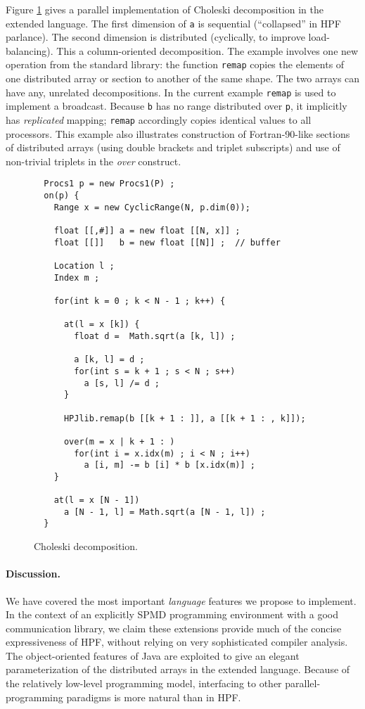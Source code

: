 Figure \ref{Choleski} gives a parallel implementation
of Choleski decomposition in the extended language.
The first dimension of {\tt a} is sequential (``collapsed''
in HPF parlance).  The second dimension is distributed (cyclically,
to improve load-balancing).  This a column-oriented decomposition.
The example involves one new operation from
the standard library: the function {\tt remap} copies the elements
of one distributed array or section to another of the same shape.
The two arrays can have any, unrelated decompositions.
In the current example {\tt remap} is used to implement a broadcast.
Because {\tt b} has no range distributed over {\tt p},
it implicitly has {\em replicated} mapping; {\tt remap} accordingly
copies identical values to all processors.  This example also
illustrates construction of Fortran-90-like sections of distributed arrays
(using double brackets and triplet subscripts)
and use of non-trivial triplets in the {\em over} construct.

\begin{figure}[bt]
\footnotesize
\begin{verbatim}
  Procs1 p = new Procs1(P) ;
  on(p) {
    Range x = new CyclicRange(N, p.dim(0));

    float [[,#]] a = new float [[N, x]] ;
    float [[]]   b = new float [[N]] ;  // buffer

    Location l ;
    Index m ;

    for(int k = 0 ; k < N - 1 ; k++) {

      at(l = x [k]) {
        float d =  Math.sqrt(a [k, l]) ;

        a [k, l] = d ;
        for(int s = k + 1 ; s < N ; s++)
          a [s, l] /= d ;
      }

      HPJlib.remap(b [[k + 1 : ]], a [[k + 1 : , k]]);

      over(m = x | k + 1 : )
        for(int i = x.idx(m) ; i < N ; i++)
          a [i, m] -= b [i] * b [x.idx(m)] ;
    }

    at(l = x [N - 1])
      a [N - 1, l] = Math.sqrt(a [N - 1, l]) ;
  }
\end{verbatim}
\normalsize
\caption{\label{Choleski}Choleski decomposition.}
\end{figure}

\paragraph{Discussion.}

We have covered the most important {\em language} features we
propose to implement.  In the
context of an explicitly SPMD programming environment with a good
communication library, we claim these extensions provide much of the
concise expressiveness of HPF, without relying on very sophisticated
compiler analysis.  The object-oriented features of Java are exploited
to give an elegant parameterization of the distributed arrays in the
extended language.  Because of the relatively low-level programming
model, interfacing to other parallel-programming paradigms is more
natural than in HPF.

